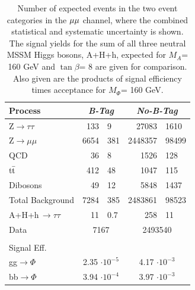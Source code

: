 \vspace*{-0.2cm}
\begin{table}[!h]
  \begin{center}
    \caption{Number of expected events in the two event categories in the $\mathrm{\mu}\mathrm{\mu}$ channel, where the combined statistical and systematic uncertainty is shown. 
      The signal yields for the sum of all three neutral MSSM Higgs bosons, A+H+h, expected for $M_{A}$= 160 GeV and $\tan\beta$= 8 are given for comparison.
      Also given are the products of signal efficiency times acceptance for $M_{\Phi}$= 160 GeV.}
\begin{tabular}{|l|r@{$ \,\,\pm\,\, $}l|r@{$ \,\,\pm\,\, $}l|} 
\hline 
Process & \multicolumn{2}{c|}{\emph{B-Tag}} & \multicolumn{2}{c|}{\emph{No-B-Tag}}\\ 
\hline 
Z$\rightarrow \tau\tau$          &       133     &       9       &       27083   &       1610    \\ 
\hline 
Z$\rightarrow \mu\mu$            &       6654    &       381     &       2448357         &       98499   \\ 
\hline 
QCD                              &       36      &       8       &       1526    &       128     \\ 
\hline 
t$\bar{\rm{t}}$                  &       412     &       48      &       1047    &       115     \\ 
\hline 
Dibosons                         &       49      &       12      &       5848    &       1437    \\ 
\hline 
\hline 
Total Background                 &       7284    &       385     &       2483861         &       98523   \\ 
\hline 
A+H+h\,$\rightarrow\tau\tau$           &       11      &       0.7    &       258      &       11       \\ 
\hline 
Data                             & \multicolumn{2}{|c|}{7167}    & \multicolumn{2}{|c|}{2493540}         \\ 
\hline 
\multicolumn{5}{c}{ } \\
\multicolumn{2}{l}{Signal Eff.} &  \multicolumn{3}{c}{ } \\
\hline
gg$\rightarrow\Phi$                &       \multicolumn{2}{|c|}{2.35 $\cdot 10^{-5}$}      &       \multicolumn{2}{|c|}{4.17 $\cdot 10^{-3}$}\\ 
\hline 
bb$\rightarrow\Phi$                &       \multicolumn{2}{|c|}{3.94 $\cdot 10^{-4}$}      &       \multicolumn{2}{|c|}{3.97 $\cdot 10^{-3}$}\\ 
\hline 
\end{tabular} 
\label{table:events_mumu} 
\end{center} 
\end{table} 

